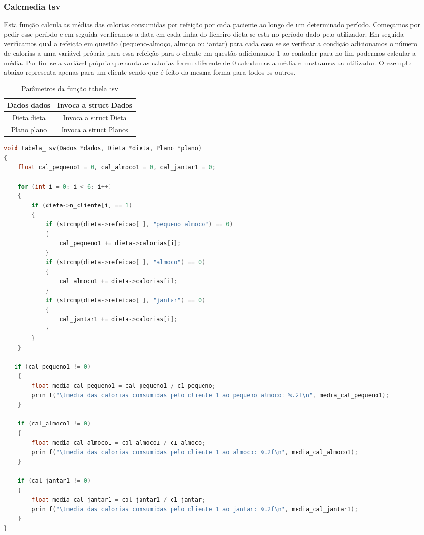 \documentclass[a4wide]{report}
\begin{document}
\subsubsection{Calcmedia tsv}
Esta função calcula as médias das calorias consumidas por refeição por cada paciente ao longo de um determinado período.
Começamos por pedir esse período e em seguida verificamos a data em cada linha do ficheiro dieta se esta no período dado pelo utilizador.
Em seguida verificamos qual a refeição em questão (pequeno-almoço, almoço ou jantar) para cada caso se se verificar a condição adicionamos o número de calorias a uma variável própria para essa refeição para o cliente em questão adicionando 1 ao contador para no fim podermos calcular a média.
Por fim se a variável própria que conta as calorias forem diferente de 0 calculamos a média e mostramos ao utilizador.
O exemplo abaixo representa apenas para um cliente sendo que é feito da mesma forma para todos os outros.
\begin{table}[h]
    \centering
    \begin{tabular}{|c|c|} \hline 
          Dados dados& Invoca a struct Dados\\ \hline 
          Dieta dieta& Invoca a struct Dieta\\ \hline 
          Plano plano& Invoca a struct Planos\\ \hline
    \end{tabular}
    \caption{Parâmetros da função tabela tsv}
    \label{tab:my_label}
\end{table}
\begin{lstlisting}[language=C, caption={tabela tsv}, label={codigo:c}, breaklines=true, basicstyle=\small]
void tabela_tsv(Dados *dados, Dieta *dieta, Plano *plano)
{
    float cal_pequeno1 = 0, cal_almoco1 = 0, cal_jantar1 = 0;

    for (int i = 0; i < 6; i++)
    {
        if (dieta->n_cliente[i] == 1)
        {
            if (strcmp(dieta->refeicao[i], "pequeno almoco") == 0)
            {
                cal_pequeno1 += dieta->calorias[i];
            }
            if (strcmp(dieta->refeicao[i], "almoco") == 0)
            {
                cal_almoco1 += dieta->calorias[i];
            }
            if (strcmp(dieta->refeicao[i], "jantar") == 0)
            {
                cal_jantar1 += dieta->calorias[i];
            }
        }
    }

   if (cal_pequeno1 != 0) 
    {
        float media_cal_pequeno1 = cal_pequeno1 / c1_pequeno;                                                  
        printf("\tmedia das calorias consumidas pelo cliente 1 ao pequeno almoco: %.2f\n", media_cal_pequeno1);
    }

    if (cal_almoco1 != 0) 
    {
        float media_cal_almoco1 = cal_almoco1 / c1_almoco;                                            
        printf("\tmedia das calorias consumidas pelo cliente 1 ao almoco: %.2f\n", media_cal_almoco1); 
    }

    if (cal_jantar1 != 0) 
    {
        float media_cal_jantar1 = cal_jantar1 / c1_jantar;                                            
        printf("\tmedia das calorias consumidas pelo cliente 1 ao jantar: %.2f\n", media_cal_jantar1);
    }
}
\end{lstlisting}
\end{document}
